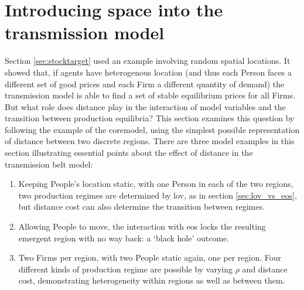 \section{Introducing space into the transmission model \label{sec:TM_space}}

Section \ref{sec:stocktarget} used an example involving random spatial locations. It showed that, if agents have heterogenous location (and thus each Person faces a different set of good prices and each Firm a different quantity of demand) the transmission model is able to find a set of stable equilibrium prices for all Firms. But what role does distance play in the interaction of model variables and the transition between production equilibria? This section examines this question by following the example of the \gls{coremodel}, using the simplest possible representation of distance between two discrete regions. There are three model examples in this section illustrating essential points about the effect of distance in the transmission belt model:

\begin{enumerate}
	\item Keeping People's location static, with one Person in each of the two regions, two production regimes are determined by \gls{lov}, as in section \ref{sec:lov_vs_eos}, but distance cost can also determine the transition between regimes.
	\item Allowing People to move, the interaction with \gls{eos} locks the resulting emergent region with no way back: a `black hole' outcome.
	\item Two Firms per region, with two People static again, one per region. Four different kinds of production regime are possible by varying $\rho$ and distance cost, demonstrating heterogeneity within regions as well as between them.
\end{enumerate}


